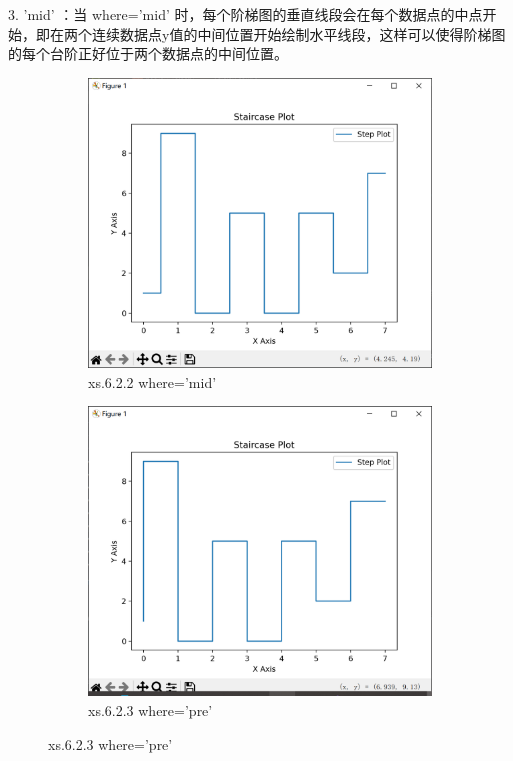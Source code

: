 \documentclass[12pt]{article}
\begin{document}
3.   'mid'  ：当  where='mid'  时，每个阶梯图的垂直线段会在每个数据点的中点开始，即在两个连续数据点y值的中间位置开始绘制水平线段，这样可以使得阶梯图的每个台阶正好位于两个数据点的中间位置。
\begin{figure}[H]
    \centering
    \begin{subfigure}[b]{0.48\textwidth}
        \includegraphics[width=\textwidth]{阶梯图 Pic1 - 副本.png} %
        \caption{xs.6.2.2 where='mid'}
        \label{fig:line-graph2}
    \end{subfigure}
    \hfill
    \begin{subfigure}[b]{0.48\textwidth}
        \includegraphics[width=\textwidth]{阶梯图 Pic2 - 副本.png} %
        \caption{xs.6.2.3 where='pre'}
        \label{fig:line-graph2-pic2}
    \end{subfigure}
\end{figure}
\end{document}
